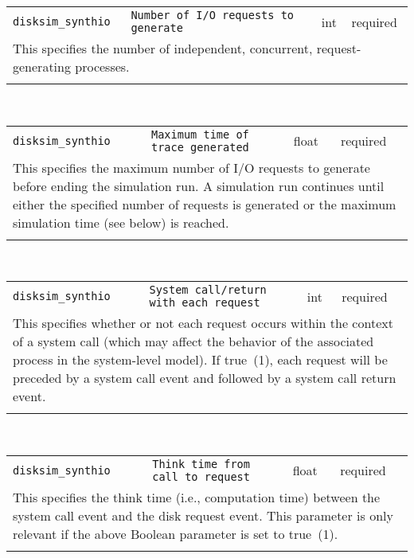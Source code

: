 \noindent 
\begin{tabular}{|p{\lpmodwidth}|p{\lpnamewidth}|p{0.5in}|p{0.5in}|}
\cline{1-4}
\texttt{disksim\_synthio} & \texttt{Number of I/O requests to generate} & int & required \\ 
\cline{1-4}
\multicolumn{4}{|p{6in}|}{
This specifies the number of independent, concurrent, request-generating
processes.
}\\ 
\cline{1-4}
\multicolumn{4}{p{5in}}{}\\
\end{tabular}\\ 
\noindent 
\begin{tabular}{|p{\lpmodwidth}|p{\lpnamewidth}|p{0.5in}|p{0.5in}|}
\cline{1-4}
\texttt{disksim\_synthio} & \texttt{Maximum time of trace generated} & float & required \\ 
\cline{1-4}
\multicolumn{4}{|p{6in}|}{
This specifies the maximum number of I/O requests to generate before
ending the simulation run. A simulation run continues until either
the specified number of requests is generated or the maximum
simulation time (see below) is reached.
}\\ 
\cline{1-4}
\multicolumn{4}{p{5in}}{}\\
\end{tabular}\\ 
\noindent 
\begin{tabular}{|p{\lpmodwidth}|p{\lpnamewidth}|p{0.5in}|p{0.5in}|}
\cline{1-4}
\texttt{disksim\_synthio} & \texttt{System call/return with each request} & int & required \\ 
\cline{1-4}
\multicolumn{4}{|p{6in}|}{
This specifies whether or not each request occurs within the context of a
system call (which may affect the behavior of the associated process
in the system-level model). If true~(1), each request will be
preceded by a system call event and followed by a system call return
event.
}\\ 
\cline{1-4}
\multicolumn{4}{p{5in}}{}\\
\end{tabular}\\ 
\noindent 
\begin{tabular}{|p{\lpmodwidth}|p{\lpnamewidth}|p{0.5in}|p{0.5in}|}
\cline{1-4}
\texttt{disksim\_synthio} & \texttt{Think time from call to request} & float & required \\ 
\cline{1-4}
\multicolumn{4}{|p{6in}|}{
This specifies the think time (i.e., computation time) between the system
call event and the disk request event. This parameter is only
relevant if the above Boolean parameter is set to true~(1).
}\\ 
\cline{1-4}
\multicolumn{4}{p{5in}}{}\\
\end{tabular}\\ 
